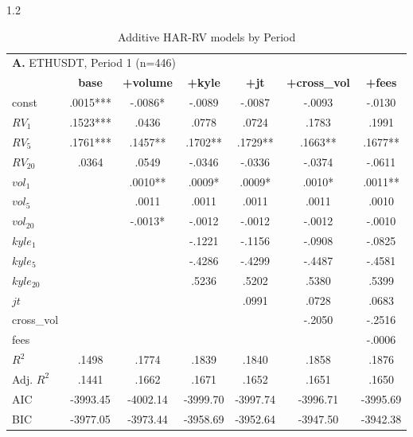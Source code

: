 \documentclass[10pt]{article}
\begin{document}
\begin{setstretch}{1.2}
\begin{small}
\renewcommand{\arraystretch}{1.2} 
\begin{longtable}{l*{6}{c}}
\caption{Additive HAR-RV models by Period}
\label{tab:additive_subperiods}\\
\multicolumn{7}{l}{\textbf{A.} ETHUSDT, Period 1 (n=446)} \\
& \textbf{base} & \textbf{+volume} & \textbf{+kyle} & \textbf{+jt} & \textbf{+cross\_vol} & \textbf{+fees} \\
\hline
const & \hfil .0015*** & \hfil -.0086* & \hfil -.0089 & \hfil -.0087 & \hfil -.0093 & \hfil -.0130 \\
$RV_1$ & \hfil .1523*** & \hfil .0436 & \hfil .0778 & \hfil .0724 & \hfil .1783 & \hfil .1991 \\
$RV_5$ & \hfil .1761*** & \hfil .1457** & \hfil .1702** & \hfil .1729** & \hfil .1663** & \hfil .1677** \\
$RV_{20}$ & \hfil .0364 & \hfil .0549 & \hfil -.0346 & \hfil -.0336 & \hfil -.0374 & \hfil -.0611 \\
$vol_1$ & & \hfil .0010** & \hfil .0009* & \hfil .0009* & \hfil .0010* & \hfil .0011** \\
$vol_5$ & & \hfil .0011 & \hfil .0011 & \hfil .0011 & \hfil .0011 & \hfil .0010 \\
$vol_{20}$ & & \hfil -.0013* & \hfil -.0012 & \hfil -.0012 & \hfil -.0012 & \hfil -.0010 \\
$kyle_1$ & & & \hfil -.1221 & \hfil -.1156 & \hfil -.0908 & \hfil -.0825 \\
$kyle_5$ & & & \hfil -.4286 & \hfil -.4299 & \hfil -.4487 & \hfil -.4581 \\
$kyle_{20}$ & & & \hfil .5236 & \hfil .5202 & \hfil .5380 & \hfil .5399 \\
$jt$ & & & & \hfil .0991 & \hfil .0728 & \hfil .0683 \\
cross\_vol & & & & & \hfil -.2050 & \hfil -.2516 \\
fees & & & & & & \hfil -.0006 \\
\hline
$R^2$ & \hfil .1498 & \hfil .1774 & \hfil .1839 & \hfil .1840 & \hfil .1858 & \hfil .1876 \\
Adj. $R^2$ & \hfil .1441 & \hfil .1662 & \hfil .1671 & \hfil .1652 & \hfil .1651 & \hfil .1650 \\
AIC & \hfil -3993.45 & \hfil -4002.14 & \hfil -3999.70 & \hfil -3997.74 & \hfil -3996.71 & \hfil -3995.69 \\
BIC & \hfil -3977.05 & \hfil -3973.44 & \hfil -3958.69 & \hfil -3952.64 & \hfil -3947.50 & \hfil -3942.38 \\

\end{longtable}
\end{small}
\end{setstretch}
\end{document}
